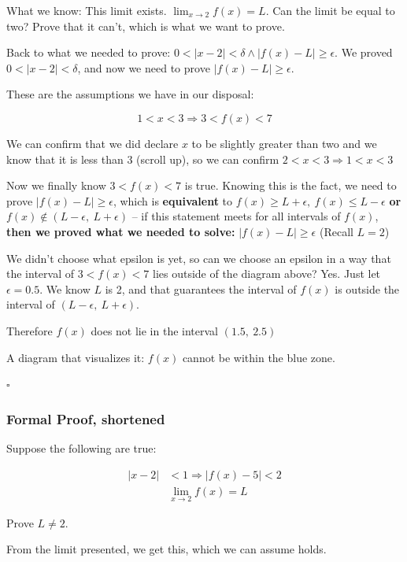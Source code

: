 \documentclass[12pt]{article}
\theoremstyle{plain}
\theoremstyle{remark}
\theoremstyle{definition}
\begin{document}
What we know: This limit exists. \(\lim_{x \rightarrow 2}{f(x) = L}\).
Can the limit be equal to two? Prove that it can't, which is what we
want to prove.

Back to what we needed to prove:
\(0 < |x - 2| < \delta \land \left| f(x) - L \right| \geq \epsilon\). We
proved \(0 < |x - 2| < \delta\), and now we need to prove
\(\left| f(x) - L \right| \geq \epsilon\).

These are the assumptions we have in our disposal:

\[1 < x < 3 \Rightarrow 3 < f(x) < 7\]

We can confirm that we did declare \(x\) to be slightly greater than two
and we know that it is less than 3 (scroll up), so we can confirm
\(2 < x < 3 \Rightarrow 1 < x < 3\)

Now we finally know \(3 < f(x) < 7\) is true. Knowing this is the fact,
we need to prove \(\left| f(x) - L \right| \geq \epsilon\), which is
\textbf{equivalent} to
\(f(x) \geq L + \epsilon,\ f(x) \leq L - \epsilon\) \textbf{or}
\(f(x) \notin (L - \epsilon,\ L + \epsilon)\) -- if this statement meets
for all intervals of \(f(x)\), \textbf{then we proved what we needed to
solve:} \(\left| f(x) - L \right| \geq \epsilon\) (Recall \(L = 2\))


We didn't choose what epsilon is yet, so can we choose an epsilon in a
way that the interval of \(3 < f(x) < 7\) lies outside of the diagram
above? Yes. Just let \(\epsilon = 0.5\). We know \(L\) is 2, and that
guarantees the interval of \(f(x)\) is outside the interval of
\((L - \epsilon,\ L + \epsilon)\).

Therefore \(f(x)\) does not lie in the interval \((1.5,\ 2.5)\)


A diagram that visualizes it: \(f(x)\) cannot be within the blue zone.

\(\square\)


\subsubsection{Formal Proof, shortened}

Suppose the following are true:

\begin{align*}
|x - 2| &< 1 \Rightarrow \left| f(x) - 5 \right| < 2 \\
&\lim_{x \rightarrow 2}{f(x) = L}\
\end{align*}


Prove \(L \neq 2\).

From the limit presented, we get this, which we can assume holds.
\end{document}
